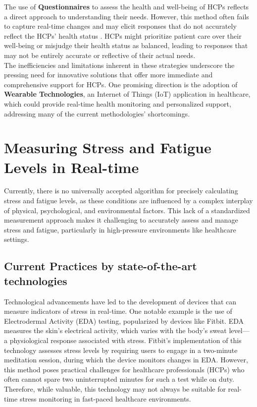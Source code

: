 The use of \textbf{Questionnaires} to assess the health and well-being of HCPs reflects a direct approach to understanding their needs. However, this method often fails to capture real-time changes and may elicit responses that do not accurately reflect the HCPs' health status \cite{ref16}. HCPs might prioritize patient care over their well-being or misjudge their health status as balanced, leading to responses that may not be entirely accurate or reflective of their actual needs. \\

\noindent The inefficiencies and limitations inherent in these strategies underscore the pressing need for innovative solutions that offer more immediate and comprehensive support for HCPs. One promising direction is the adoption of \textbf{Wearable Technologies}, an Internet of Things (IoT) application in healthcare, which could provide real-time health monitoring and personalized support, addressing many of the current methodologies' shortcomings.

\section{Measuring Stress and Fatigue Levels in Real-time}
Currently, there is no universally accepted algorithm for precisely calculating stress and fatigue levels, as these conditions are influenced by a complex interplay of physical, psychological, and environmental factors. This lack of a standardized measurement approach makes it challenging to accurately assess and manage stress and fatigue, particularly in high-pressure environments like healthcare settings.


\subsection{Current Practices by state-of-the-art technologies}
Technological advancements have led to the development of devices that can measure indicators of stress in real-time. One notable example is the use of Electrodermal Activity (EDA) testing, popularized by devices like Fitbit. EDA measures the skin's electrical activity, which varies with the body’s sweat level— a physiological response associated with stress. Fitbit's implementation of this technology assesses stress levels by requiring users to engage in a two-minute meditation session, during which the device monitors changes in EDA. \cite{49} However, this method poses practical challenges for healthcare professionals (HCPs) who often cannot spare two uninterrupted minutes for such a test while on duty. Therefore, while valuable, this technology may not always be suitable for real-time stress monitoring in fast-paced healthcare environments.


